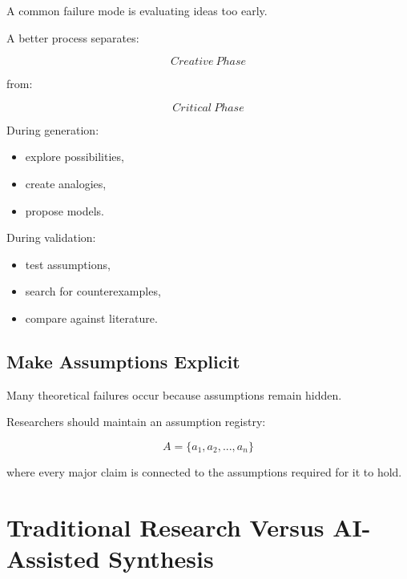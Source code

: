 \documentclass[11pt]{article}
\begin{document}
A common failure mode is evaluating ideas too early.


A better process separates:


\[
Creative\ Phase
\]


from:


\[
Critical\ Phase
\]


During generation:

\begin{itemize}

\item explore possibilities,

\item create analogies,

\item propose models.

\end{itemize}


During validation:

\begin{itemize}

\item test assumptions,

\item search for counterexamples,

\item compare against literature.

\end{itemize}



\subsection{Make Assumptions Explicit}


Many theoretical failures occur because assumptions remain hidden.


Researchers should maintain an assumption registry:


\[
A=
\{a_1,a_2,...,a_n\}
\]


where every major claim is connected to the assumptions required for it
to hold.



\section{Traditional Research Versus AI-Assisted Synthesis}
\end{document}
